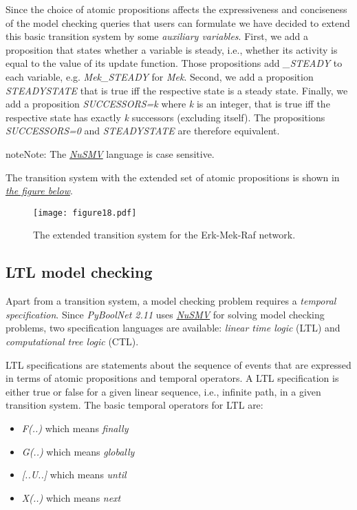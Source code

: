 \documentclass[letterpaper,10pt,english]{sphinxmanual}
\begin{document}
Since the choice of atomic propositions affects the expressiveness and conciseness of the model checking queries that users can formulate
we have decided to extend this basic transition system by some \emph{auxiliary variables}.
First, we add a proposition that states whether a variable is steady, i.e., whether its activity is equal to the value of its update function.
Those propositions add \emph{\_STEADY} to each variable, e.g. \emph{Mek\_STEADY} for \emph{Mek}.
Second, we add a proposition \emph{STEADYSTATE} that is true iff the respective state is a steady state.
Finally, we add a proposition \emph{SUCCESSORS=k} where \emph{k} is an integer,
that is true iff the respective state has exactly \emph{k} successors (excluding itself).
The propositions \emph{SUCCESSORS=0} and \emph{STEADYSTATE} are therefore equivalent.

\begin{notice}{note}{Note:}
The {\hyperref[Installation:installation-nusmv]{\emph{NuSMV}}} language is case sensitive.
\end{notice}

The transition system with the extended set of atomic propositions is shown in {\hyperref[Manual:figure18]{\emph{the figure below}}}.
\begin{figure}[htbp]
\centering
\capstart

\texttt{[image: figure18.pdf]}
\caption{The extended transition system for the Erk-Mek-Raf network.}\label{Manual:figure18}\end{figure}


\subsection{LTL model checking}
\label{Manual:ltl-model-checking}
Apart from a transition system, a model checking problem requires a \emph{temporal specification}.
Since \emph{PyBoolNet 2.11} uses {\hyperref[Installation:installation-nusmv]{\emph{NuSMV}}} for solving model checking problems, two specification languages are available:
\emph{linear time logic} (LTL) and \emph{computational tree logic} (CTL).

LTL specifications are statements about the sequence of events that are expressed in terms of atomic propositions and temporal operators.
A LTL specification is either true or false for a given linear sequence, i.e., infinite path, in a given transition system.
The basic temporal operators for LTL are:
\begin{itemize}
\item {} 
\emph{F(..)} which means \emph{finally}

\item {} 
\emph{G(..)} which means \emph{globally}

\item {} 
\emph{{[}..U..{]}} which means \emph{until}

\item {} 
\emph{X(..)} which means \emph{next}

\end{itemize}
\end{document}
